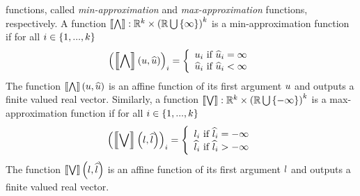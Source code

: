 functions, called \emph{min-approximation} and
\emph{max-approximation} functions, respectively.  A function
$\llbracket\bigwedge\rrbracket:\mathbb{R}^k\times\left(\mathbb{R}\bigcup\left\{\infty\right\}\right)^k$ is a
min-approximation function if for all $i\in\left\{1,...,k\right\}$
%
\[
\left(\left\llbracket\bigwedge\right\rrbracket\left(u,\widehat{u}\right)\right)_i=
\left\{
\begin{array}{l}
u_i~\text{if}~\widehat{u}_i=\infty\\
\widehat{u}_i~\text{if}~\widehat{u}_i<\infty
\end{array}
\right.
\]
%
The function $\left\llbracket\bigwedge\right\rrbracket\left(u,\widehat{u}\right)$ is an affine function of its
first argument $u$ and outputs a finite valued real vector.
Similarly, a function
$\llbracket\bigvee\rrbracket:\mathbb{R}^k\times\left(\mathbb{R}\bigcup\left\{-\infty\right\}\right)^k$
is a max-approximation function if for all $i\in\left\{1,...,k\right\}$
%
\[
\left(\left\llbracket\bigvee\right\rrbracket\left(l,\widehat{l}\right)\right)_i=
\left\{
\begin{array}{l}
l_i~\text{if}~\widehat{l}_i=-\infty\\
\widehat{l}_i~\text{if}~\widehat{l}_i>-\infty
\end{array}
\right.
\]
%
The function $\left\llbracket\bigvee\right\rrbracket\left(l,\widehat{l}\right)$ is an affine function of its
first argument $l$ and outputs a finite valued real vector.

